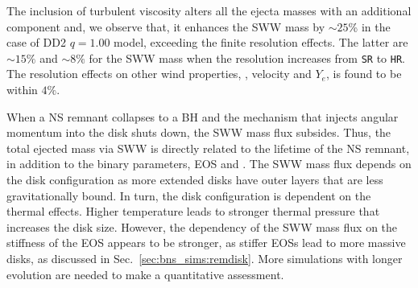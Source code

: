 The inclusion of turbulent viscosity alters all the ejecta masses with an
additional component \citep{Radice:2018ghv} and, we observe that, it enhances the 
\ac{SWW} mass by ${\sim}25$\% in the case of DD2 $q=1.00$ model,
exceeding the finite resolution effects. 
%
The latter are ${\sim}15\%$ and ${\sim}8\%$ for the \ac{SWW} mass when the 
resolution increases from \texttt{SR} to \texttt{HR}.
The resolution effects on other wind properties, \eg, velocity and $Y_e$, 
is found to be within $4\%$.

When a \ac{NS} remnant collapses to a \ac{BH} and the mechanism that injects angular 
momentum into the disk shuts down, the \ac{SWW} mass flux subsides.
Thus, the total ejected mass via \ac{SWW} is directly related to the lifetime of the 
\ac{NS} remnant, in addition to the binary parameters, \ac{EOS} and \mr{}.
%
The \ac{SWW} mass flux depends on the disk configuration as more extended disks 
have outer layers that are less gravitationally bound. In turn, the disk 
configuration is dependent on the thermal effects. Higher temperature leads to 
stronger thermal pressure that increases the disk size. 
However, the dependency of the \ac{SWW} mass flux on the stiffness of the \ac{EOS} 
appears to be stronger, as stiffer \acp{EOS} lead to more massive disks, 
as discussed in Sec.~\ref{sec:bns_sims:remdisk}.   %
More simulations with longer \pmerg{} evolution are needed 
to make a quantitative assessment. 

